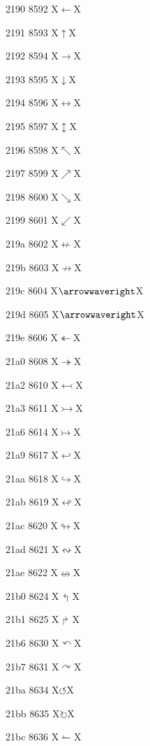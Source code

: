 \documentclass[11pt]{article}
\begin{document}
2190 8592 X{\ensuremath{\leftarrow}}X

2191 8593 X{\ensuremath{\uparrow}}X

2192 8594 X{\ensuremath{\rightarrow}}X

2193 8595 X{\ensuremath{\downarrow}}X

2194 8596 X{\ensuremath{\leftrightarrow}}X

2195 8597 X{\ensuremath{\updownarrow}}X

2196 8598 X{\ensuremath{\nwarrow}}X

2197 8599 X{\ensuremath{\nearrow}}X

2198 8600 X{\ensuremath{\searrow}}X

2199 8601 X{\ensuremath{\swarrow}}X

219a 8602 X{\ensuremath{\nleftarrow}}X

219b 8603 X{\ensuremath{\nrightarrow}}X

219c 8604 X{\ensuremath{\arrowwaveright}}X

219d 8605 X{\ensuremath{\arrowwaveright}}X

219e 8606 X{\ensuremath{\twoheadleftarrow}}X

21a0 8608 X{\ensuremath{\twoheadrightarrow}}X

21a2 8610 X{\ensuremath{\leftarrowtail}}X

21a3 8611 X{\ensuremath{\rightarrowtail}}X

21a6 8614 X{\ensuremath{\mapsto}}X

21a9 8617 X{\ensuremath{\hookleftarrow}}X

21aa 8618 X{\ensuremath{\hookrightarrow}}X

21ab 8619 X{\ensuremath{\looparrowleft}}X

21ac 8620 X{\ensuremath{\looparrowright}}X

21ad 8621 X{\ensuremath{\leftrightsquigarrow}}X

21ae 8622 X{\ensuremath{\nleftrightarrow}}X

21b0 8624 X{\ensuremath{\Lsh}}X

21b1 8625 X{\ensuremath{\Rsh}}X

21b6 8630 X{\ensuremath{\curvearrowleft}}X

21b7 8631 X{\ensuremath{\curvearrowright}}X

21ba 8634 X{\ensuremath{\circlearrowleft}}X

21bb 8635 X{\ensuremath{\circlearrowright}}X

21bc 8636 X{\ensuremath{\leftharpoonup}}X
\end{document}
